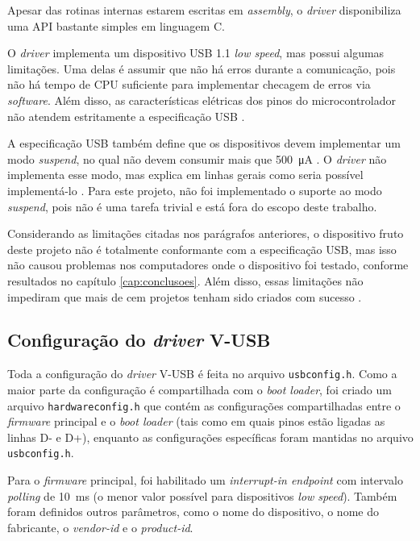 \documentclass[brazil,pagestart=firstchapter]{abnt}
\newcommand*{\VUSB}{\mbox{V-USB}\xspace}
\begin{document}
Apesar das rotinas internas estarem escritas em \textit{assembly}, o
\textit{driver} disponibiliza uma \ac{API} bastante simples em linguagem C.

O \textit{driver} implementa um dispositivo \ac{USB} 1.1 \textit{low speed},
mas possui algumas limitações. Uma delas é assumir que não há erros durante
a comunicação, pois não há tempo de CPU suficiente para implementar checagem
de erros via \textit{software}. Além disso, as características elétricas dos
pinos do microcontrolador não atendem estritamente a especificação \ac{USB}
\cite{VUSBdriver}.

A especificação \ac{USB} também define que os dispositivos devem implementar
um modo \textit{suspend}, no qual não devem consumir mais que
\SI{500}{\micro\ampere} \cite{usbinanutshell}. O \textit{driver} não
implementa esse modo, mas explica em linhas gerais como seria possível
implementá-lo \cite{VUSBdriver}. Para este projeto, não foi
implementado o suporte ao modo \textit{suspend}, pois não é uma tarefa
trivial e está fora do escopo deste trabalho.

Considerando as limitações citadas nos parágrafos anteriores, o dispositivo
fruto deste projeto não é totalmente conformante com a especificação
\ac{USB}, mas isso não causou problemas nos computadores onde o dispositivo
foi testado, conforme resultados no capítulo \ref{cap:conclusoes}. Além
disso, essas limitações não impediram que mais de cem projetos tenham sido
criados com sucesso \cite{VUSBprojects}.


\subsection{Configuração do \textit{driver} \VUSB}
\label{sub:vusb_config}

Toda a configuração do \textit{driver} \VUSB é feita no arquivo
\texttt{usbconfig.h}. Como a maior parte da configuração é compartilhada com
o \textit{boot loader}, foi criado um arquivo \texttt{hardwareconfig.h} que
contém as configurações compartilhadas entre o \textit{firmware} principal e
o \textit{boot loader} (tais como em quais pinos estão ligadas as linhas D-
e D+), enquanto as configurações específicas foram mantidas no arquivo
\texttt{usbconfig.h}.

Para o \textit{firmware} principal, foi habilitado um \textit{interrupt-in
endpoint} com intervalo \textit{polling} de \SI{10}{\milli\second} (o menor
valor possível para dispositivos \textit{low speed}). Também foram definidos
outros parâmetros, como o nome do dispositivo, o nome do fabricante, o
\textit{vendor-id} e o \textit{product-id}.
\end{document}
